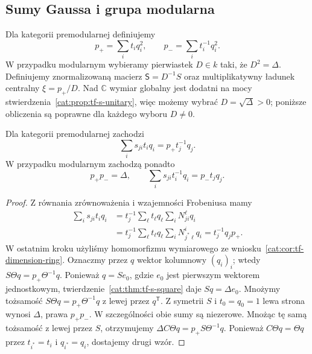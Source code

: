 \subsection{Sumy Gaussa i grupa modularna}

\begin{definicja}\label{cat:def:tf-gauss-sums}
Dla kategorii premodularnej definiujemy
\[
 p_+=\sum_i t_i q_i^2,\qquad p_-=\sum_i t_i^{-1}q_i^2.
\]
W przypadku modularnym wybieramy pierwiastek $D\in k$ taki, że $D^2=\Delta$. Definiujemy znormalizowaną macierz $\mathsf S=D^{-1}S$ oraz multiplikatywny ładunek centralny $\xi=p_+/D$. Nad $\mathbb C$ wymiar globalny jest dodatni na mocy stwierdzenia~\ref{cat:prop:tf-s-unitary}, więc możemy wybrać $D=\sqrt{\Delta}>0$; poniższe obliczenia są poprawne dla każdego wyboru $D\neq0$.
\end{definicja}

\begin{stwierdzenie}\label{cat:prop:tf-gauss-vector}
Dla kategorii premodularnej zachodzi
\[
 \sum_i s_{ji}t_iq_i=p_+t_j^{-1}q_j.
\]
W przypadku modularnym zachodzą ponadto
\[
 p_+p_-=\Delta,\qquad
 \sum_i s_{ji}t_i^{-1}q_i=p_-t_jq_j.
\]
\end{stwierdzenie}
\begin{proof}
Z równania zrównoważenia i wzajemności Frobeniusa mamy
\[
\begin{aligned}
 \sum_i s_{ji}t_iq_i
 &=t_j^{-1}\sum_\ell t_\ell q_\ell
     \sum_i N_{ji}^{\ell}q_i\\
 &=t_j^{-1}\sum_\ell t_\ell q_\ell
     \sum_i N_{j^*\ell}^{i}q_i
 =t_j^{-1}q_jp_+.
\end{aligned}
\]
W ostatnim kroku użyliśmy homomorfizmu wymiarowego ze wniosku~\ref{cat:cor:tf-dimension-ring}. Oznaczmy przez $q$ wektor kolumnowy $(q_i)_i$; wtedy $S\Theta q=p_+\Theta^{-1}q$. Ponieważ $q=Se_0$, gdzie $e_0$ jest pierwszym wektorem jednostkowym, twierdzenie~\ref{cat:thm:tf-s-square} daje $Sq=\Delta e_0$. Mnożymy tożsamość $S\Theta q=p_+\Theta^{-1}q$ z lewej przez $q^{\mathsf T}$. Z symetrii $S$ i $t_0=q_0=1$ lewa strona wynosi $\Delta$, prawa $p_+p_-$. W szczególności obie sumy są niezerowe. Mnożąc tę samą tożsamość z lewej przez $S$, otrzymujemy $\Delta C\Theta q=p_+ S\Theta^{-1}q$. Ponieważ $C\Theta q=\Theta q$ przez $t_{i^*}=t_i$ i $q_{i^*}=q_i$, dostajemy drugi wzór.
\end{proof}

